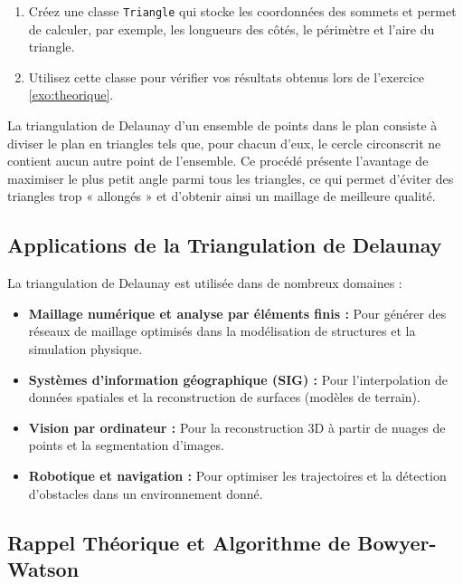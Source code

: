 \documentclass[a4paper,12pt]{article}
\theoremstyle{definition}
\begin{document}
\label{exo:triangle}
\begin{enumerate}
  \item Créez une classe \texttt{Triangle} qui stocke les coordonnées des sommets et permet de calculer, par exemple, les longueurs des côtés, le périmètre et l’aire du triangle.
  \item Utilisez cette classe pour vérifier vos résultats obtenus lors de l'exercice \ref{exo:theorique}.
\end{enumerate} 


La triangulation de Delaunay d'un ensemble de points dans le plan consiste à diviser le plan en triangles tels que, pour chacun d'eux, le cercle circonscrit ne contient aucun autre point de l'ensemble. Ce procédé présente l'avantage de maximiser le plus petit angle parmi tous les triangles, ce qui permet d'éviter des triangles trop « allongés » et d'obtenir ainsi un maillage de meilleure qualité.

\subsection{Applications de la Triangulation de Delaunay}

La triangulation de Delaunay est utilisée dans de nombreux domaines :
\begin{itemize}
  \item \textbf{Maillage numérique et analyse par éléments finis :} Pour générer des réseaux de maillage optimisés dans la modélisation de structures et la simulation physique.
  \item \textbf{Systèmes d'information géographique (SIG) :} Pour l'interpolation de données spatiales et la reconstruction de surfaces (modèles de terrain).
  \item \textbf{Vision par ordinateur :} Pour la reconstruction 3D à partir de nuages de points et la segmentation d'images.
  \item \textbf{Robotique et navigation :} Pour optimiser les trajectoires et la détection d'obstacles dans un environnement donné.
\end{itemize}

\subsection{Rappel Théorique et Algorithme de Bowyer-Watson}
\end{document}
